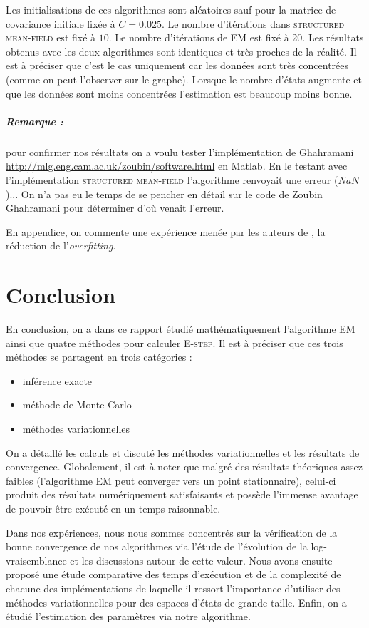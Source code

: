 \documentclass[10pt,a4paper]{article}
\newcommand{\Estep}{\textsc{E-step}}
\newcommand{\EM}{\textsc{EM}}
\newcommand{\structmeanfield}{\textsc{structured mean-field}}
\begin{document}
Les initialisations de ces algorithmes sont aléatoires sauf pour la matrice de covariance initiale fixée à $C= 0.025$. Le nombre d'itérations dans \structmeanfield{} est fixé à $10$. Le nombre d'itérations de \EM{} est fixé à 20. Les résultats obtenus avec les deux algorithmes sont identiques et très proches de la réalité. Il est à préciser que c'est le cas uniquement car les données sont très concentrées (comme on peut l'observer sur le graphe). Lorsque le nombre d'états augmente et que les données sont moins concentrées l'estimation est beaucoup moins bonne.

\subparagraph{Remarque :} pour confirmer nos résultats on a voulu tester l'implémentation de Ghahramani \href{url}{http://mlg.eng.cam.ac.uk/zoubin/software.html} en Matlab. En le testant avec l'implémentation \structmeanfield{} l'algorithme renvoyait une erreur ($NaN$)... On n'a pas eu le temps de se pencher en détail sur le code de Zoubin Ghahramani pour déterminer d'où venait l'erreur.

En appendice, on commente une expérience menée par les auteurs de \cite{ghahramani1997factorial}, la réduction de l'\textit{overfitting}.

\section{Conclusion}
En conclusion, on a dans ce rapport étudié mathématiquement l'algorithme \EM{} ainsi que quatre méthodes pour calculer \Estep{}. Il est à préciser que ces trois méthodes se partagent en trois catégories : 
\begin{itemize}
\item inférence exacte
\item méthode de Monte-Carlo
\item méthodes variationnelles
\end{itemize}
On a détaillé les calculs et discuté les méthodes variationnelles et les résultats de convergence. Globalement, il est à noter que malgré des résultats théoriques assez faibles (l'algorithme \EM{} peut converger vers un point stationnaire), celui-ci produit des résultats numériquement satisfaisants et possède l'immense avantage de pouvoir être exécuté en un temps raisonnable.

Dans nos expériences, nous nous sommes concentrés sur la vérification de la bonne convergence de nos 
algorithmes via l'étude de l'évolution de la log-vraisemblance et les discussions autour de cette valeur. Nous avons ensuite proposé une étude comparative des temps d'exécution et de la complexité de chacune des implémentations de laquelle il ressort l'importance d'utiliser des méthodes variationnelles pour des espaces d'états de grande taille. Enfin, on a étudié l'estimation des paramètres via notre algorithme.
\end{document}
